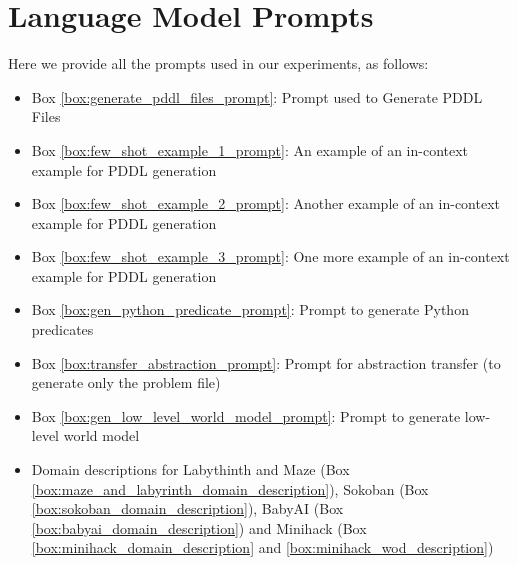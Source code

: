 \documentclass{article}
\theoremstyle{plain}
\theoremstyle{definition}
\theoremstyle{remark}
\begin{document}
\section{Language Model Prompts}
\label{app:prompts}
Here we provide all the prompts used in our experiments, as follows:

\begin{itemize}
\item Box \ref{box:generate_pddl_files_prompt}: Prompt used to Generate PDDL Files 
\item Box \ref{box:few_shot_example_1_prompt}: An example of an in-context example for PDDL generation
\item Box \ref{box:few_shot_example_2_prompt}: Another example of an in-context example for PDDL generation
\item Box \ref{box:few_shot_example_3_prompt}: One more example of an in-context example for PDDL generation

\item Box \ref{box:gen_python_predicate_prompt}: Prompt to generate Python predicates 

\item Box \ref{box:transfer_abstraction_prompt}: Prompt for abstraction transfer  (to generate only the problem file)
\item Box \ref{box:gen_low_level_world_model_prompt}: Prompt to generate low-level world model
\item Domain descriptions for Labythinth and Maze (Box \ref{box:maze_and_labyrinth_domain_description}), Sokoban (Box \ref{box:sokoban_domain_description}), BabyAI (Box \ref{box:babyai_domain_description}) and Minihack (Box \ref{box:minihack_domain_description} and \ref{box:minihack_wod_description})
\end{itemize}
\end{document}
